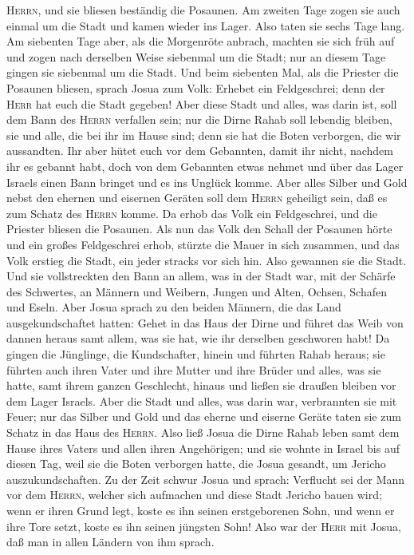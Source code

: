 \textsc{Herrn}, und sie bliesen beständig die Posaunen. 
Am zweiten Tage zogen sie auch einmal um die Stadt und kamen wieder ins
Lager. Also taten sie sechs Tage lang.  Am siebenten Tage
aber, als die Morgenröte anbrach, machten sie sich früh auf und zogen
nach derselben Weise siebenmal um die Stadt; nur an diesem Tage gingen
sie siebenmal um die Stadt.  Und beim siebenten Mal, als
die Priester die Posaunen bliesen, sprach Josua zum Volk: Erhebet ein
Feldgeschrei; denn der \textsc{Herr} hat euch die Stadt gegeben!
 Aber diese Stadt und alles, was darin ist, soll dem Bann
des \textsc{Herrn} verfallen sein; nur die Dirne Rahab soll lebendig
bleiben, sie und alle, die bei ihr im Hause sind; denn sie hat die Boten
verborgen, die wir aussandten.  Ihr aber hütet euch vor
dem Gebannten, damit ihr nicht, nachdem ihr es gebannt habt, doch von
dem Gebannten etwas nehmet und über das Lager Israels einen Bann bringet
und es ins Unglück komme.  Aber alles Silber und Gold
nebst den ehernen und eisernen Geräten soll dem \textsc{Herrn} geheiligt
sein, daß es zum Schatz des \textsc{Herrn} komme.  Da
erhob das Volk ein Feldgeschrei, und die Priester bliesen die Posaunen.
Als nun das Volk den Schall der Posaunen hörte und ein großes
Feldgeschrei erhob, stürzte die Mauer in sich zusammen, und das Volk
erstieg die Stadt, ein jeder stracks vor sich hin. Also gewannen sie die
Stadt.  Und sie vollstreckten den Bann an allem, was in
der Stadt war, mit der Schärfe des Schwertes, an Männern und Weibern,
Jungen und Alten, Ochsen, Schafen und Eseln.  Aber Josua
sprach zu den beiden Männern, die das Land ausgekundschaftet hatten:
Gehet in das Haus der Dirne und führet das Weib von dannen heraus samt
allem, was sie hat, wie ihr derselben geschworen habt! 
Da gingen die Jünglinge, die Kundschafter, hinein und führten Rahab
heraus; sie führten auch ihren Vater und ihre Mutter und ihre Brüder und
alles, was sie hatte, samt ihrem ganzen Geschlecht, hinaus und ließen
sie draußen bleiben vor dem Lager Israels.  Aber die
Stadt und alles, was darin war, verbrannten sie mit Feuer; nur das
Silber und Gold und das eherne und eiserne Geräte taten sie zum Schatz
in das Haus des \textsc{Herrn}.  Also ließ Josua die
Dirne Rahab leben samt dem Hause ihres Vaters und allen ihren
Angehörigen; und sie wohnte in Israel bis auf diesen Tag, weil sie die
Boten verborgen hatte, die Josua gesandt, um Jericho auszukundschaften.
 Zu der Zeit schwur Josua und sprach: Verflucht sei der
Mann vor dem \textsc{Herrn}, welcher sich aufmachen und diese Stadt
Jericho bauen wird; wenn er ihren Grund legt, koste es ihn seinen
erstgeborenen Sohn, und wenn er ihre Tore setzt, koste es ihn seinen
jüngsten Sohn!  Also war der \textsc{Herr} mit Josua, daß
man in allen Ländern von ihm sprach.

